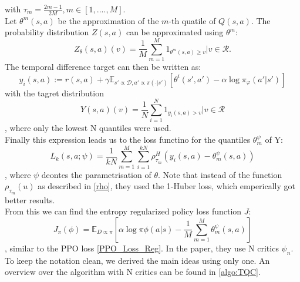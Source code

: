 with ${\tau_m = \frac{2m-1}{2M}}, m \in [1, ...., M]$.\\
Let $\theta^m(s,a)$ be the approximation of the $m$-th quatile of $Q(s,a)$. The probability distribution $Z(s,a)$ can be approximated using $\theta^m$:
\begin{equation}
    Z_{\theta}(s,a) (v) = \frac{1}{M} \sum_{m=1}^M 1_{\theta^m(s,a) \geq v} | v\in\mathcal{R}.
\end{equation}
The temporal difference target can then be written as:
\begin{equation}
    y_i(s,a) := r(s,a) + \gamma \mathbb{E}_{s' \propto \mathcal{D}, a' \propto \pi(\cdot|s')}[\theta^i(s',a') - \alpha \log \pi_{\varphi}(a'|s')]
\end{equation}
with the tagret distribution
\begin{equation}
    Y(s,a)(v) = \frac{1}{N} \sum_{i=1}^N 1_{y_i(s,a) > v} | v \in \mathcal{R}
\end{equation}
, where only the lowest N quantiles were used. \\
Finally this expression leads us to the loss functino for the quantiles $\theta_m^{\psi}$ of Y:
\begin{equation}
    L_k(s,a;\psi) = \frac{1}{kN}\sum_{m=1}^{M}\sum_{i=1}^{kN}\rho^H_{\tau_m} \left(y_i(s,a) - \theta_m^{\psi}(s,a)\right)
\end{equation}
, where $\psi$ deontes the parametrisation of $\theta$. Note that instead of the function $\rho_{\tau_m}(u)$ as described in \ref{rho}, they used the 
1-Huber loss, which emperically got better results. \\
From this we can find the entropy regularized policy loss function $J$:
\begin{equation}
    J_\pi(\phi) = \mathbb{E}_{D \propto \pi}\left[\alpha\log\pi{\phi}(a|s) - \frac{1}{M}\sum_{m=1}^{M}\theta_m^{\psi}(s,a)\right]
\end{equation}
, similar to the PPO loss \ref{PPO_Loss_Reg}. In the paper, they use N critics $\psi_n$. To keep the notation clean, we derived the main ideas using only one. An 
overview over the algorithm with N critics can be found in \ref{algo:TQC}.

